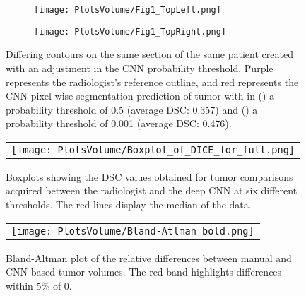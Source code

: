 \documentclass{article}
\begin{document}
\begin{figure}[H]
    \centering
    \begin{subfigure}{.4009\textwidth}
        \texttt{[image: PlotsVolume/Fig1\_TopLeft.png]} 
        \caption{} 
        \label{fig:TopLeft}
    \end{subfigure}
    \begin{subfigure}{.4\textwidth}
        \texttt{[image: PlotsVolume/Fig1\_TopRight.png]} 
        \caption{} 
        \label{fig:TopRight}
    \end{subfigure}
    \caption{Differing contours on the same section of the same patient created with an adjustment in the CNN probability threshold. Purple represents the radiologist’s reference outline, and red represents the CNN pixel-wise segmentation prediction of tumor with in () a probability threshold of 0.5 (average DSC: 0.357) and () a probability threshold of 0.001 (average DSC: 0.476). 
    }
    \label{fig:probmaps}
\end{figure}

\begin{figure} [H]
   \begin{center}
   \begin{tabular}{c} %
   \texttt{[image: PlotsVolume/Boxplot\_of\_DICE\_for\_full.png]}
   \end{tabular}
   \end{center}
   \caption{Boxplots showing the DSC values obtained for tumor comparisons acquired between the radiologist and the deep CNN at six different thresholds. The red lines display the median of the data. }
   \label{fig:Dice full}
\end{figure} 

\begin{figure} [H]
   \begin{center}
   \begin{tabular}{c} %
   \texttt{[image: PlotsVolume/Bland-Atlman\_bold.png]}
   \end{tabular}
   \end{center}
   \caption{Bland-Altman plot of the relative differences between manual and CNN-based tumor volumes. The red band highlights differences within 5\% of 0.}
   \label{fig:BA plot}
\end{figure} 
\end{document}
